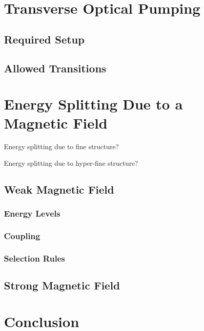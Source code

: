 \documentclass[letter,12pt]{article}
\begin{document}
\section{Transverse Optical Pumping}

	\subsection{Required Setup}

	\subsection{Allowed Transitions}

\section{Energy Splitting Due to a Magnetic Field}
        Energy splitting due to fine structure?

        Energy splitting due to hyper-fine structure?

	\subsection{Weak Magnetic Field}
		\subsubsection{Energy Levels}
		\subsubsection{Coupling}
		\subsubsection{Selection Rules}

	\subsection{Strong Magnetic Field}

\section{Conclusion}



\end{document}
